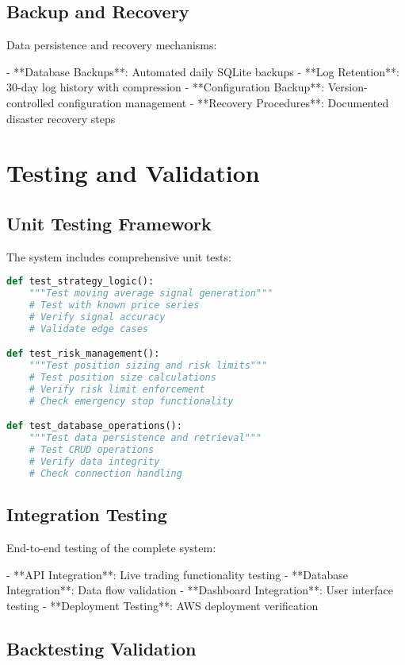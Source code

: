 \documentclass[12pt,a4paper]{article}
\begin{document}
\subsection{Backup and Recovery}

Data persistence and recovery mechanisms:

- **Database Backups**: Automated daily SQLite backups
- **Log Retention**: 30-day log history with compression
- **Configuration Backup**: Version-controlled configuration management
- **Recovery Procedures**: Documented disaster recovery steps

\section{Testing and Validation}

\subsection{Unit Testing Framework}

The system includes comprehensive unit tests:

\begin{lstlisting}[language=Python, caption=Test Coverage]
def test_strategy_logic():
    """Test moving average signal generation"""
    # Test with known price series
    # Verify signal accuracy
    # Validate edge cases

def test_risk_management():
    """Test position sizing and risk limits"""
    # Test position size calculations
    # Verify risk limit enforcement
    # Check emergency stop functionality

def test_database_operations():
    """Test data persistence and retrieval"""
    # Test CRUD operations
    # Verify data integrity
    # Check connection handling
\end{lstlisting}

\subsection{Integration Testing}

End-to-end testing of the complete system:

- **API Integration**: Live trading functionality testing
- **Database Integration**: Data flow validation
- **Dashboard Integration**: User interface testing
- **Deployment Testing**: AWS deployment verification

\subsection{Backtesting Validation}
\end{document}

